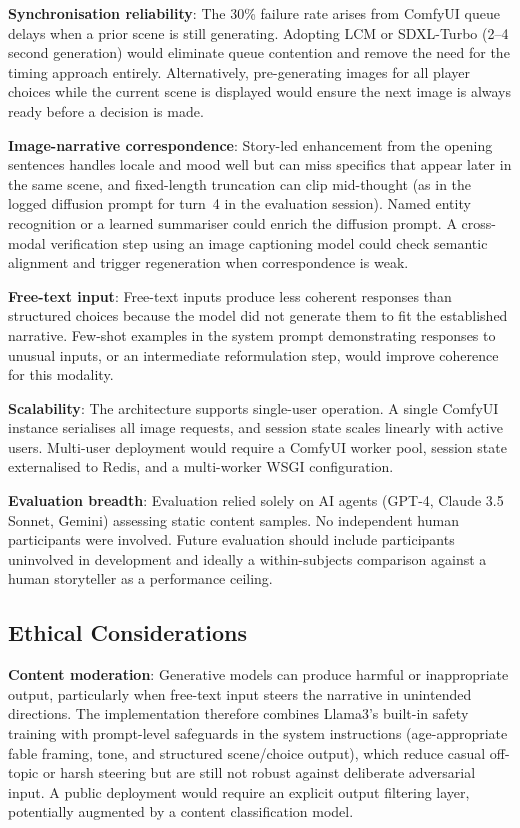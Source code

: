 \documentclass[12pt,a4paper]{article}
\begin{document}
\textbf{Synchronisation reliability}: The 30\% failure rate arises from ComfyUI queue delays when a prior scene is still generating. Adopting LCM or SDXL-Turbo (2--4 second generation) would eliminate queue contention and remove the need for the timing approach entirely. Alternatively, pre-generating images for all player choices while the current scene is displayed would ensure the next image is always ready before a decision is made.

\textbf{Image-narrative correspondence}: Story-led enhancement from the opening sentences handles locale and mood well but can miss specifics that appear later in the same scene, and fixed-length truncation can clip mid-thought (as in the logged diffusion prompt for turn~4 in the evaluation session). Named entity recognition or a learned summariser could enrich the diffusion prompt. A cross-modal verification step using an image captioning model could check semantic alignment and trigger regeneration when correspondence is weak.

\textbf{Free-text input}: Free-text inputs produce less coherent responses than structured choices because the model did not generate them to fit the established narrative. Few-shot examples in the system prompt demonstrating responses to unusual inputs, or an intermediate reformulation step, would improve coherence for this modality.

\textbf{Scalability}: The architecture supports single-user operation. A single ComfyUI instance serialises all image requests, and session state scales linearly with active users. Multi-user deployment would require a ComfyUI worker pool, session state externalised to Redis, and a multi-worker WSGI configuration.

\textbf{Evaluation breadth}: Evaluation relied solely on AI agents (GPT-4, Claude 3.5 Sonnet, Gemini) assessing static content samples. No independent human participants were involved. Future evaluation should include participants uninvolved in development and ideally a within-subjects comparison against a human storyteller as a performance ceiling.

\subsection{Ethical Considerations}

\textbf{Content moderation}: Generative models can produce harmful or inappropriate output, particularly when free-text input steers the narrative in unintended directions. The implementation therefore combines Llama3's built-in safety training with prompt-level safeguards in the system instructions (age-appropriate fable framing, tone, and structured scene/choice output), which reduce casual off-topic or harsh steering but are still not robust against deliberate adversarial input. A public deployment would require an explicit output filtering layer, potentially augmented by a content classification model.
\end{document}
